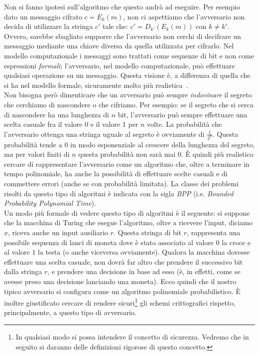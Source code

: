 \documentclass[a4paper,openright,twoside,12pt]{report}
\begin{document}
Non si fanno ipotesi sull'algoritmo che questo andr\`a ad eseguire.
Per esempio dato un messaggio cifrato $c=E_k(m)$, non ci aspettiamo che l'avversario non decida di utilizzare la stringa $c'$ tale che:  $c'=D_{k'}(E_k(m))$ con $k\neq k'$. 
Ovvero, sarebbe sbagliato supporre che l'avversario non cerchi di decifrare un messaggio mediante una chiave diversa 
da quella utilizzata per cifrarlo.
Nel modello computazionale i messaggi sono trattati come sequenze di bit e non come espressioni \emph{formali}; l'avversario, nel modello computazionale, pu\`o effettuare qualsiasi operazione su un messaggio. Questa visione \`e, a differenza di quella 
che si ha nel modello formale, sicuramente molto pi\`u realistica~\cite{DBLP:conf/crypto/2006}.\\

Non bisogna per\`o dimenticare che un avversario può sempre \emph{indovinare} il segreto che cerchiamo di nascondere o che cifriamo. 
Per esempio: se il segreto che si cerca di nascondere ha una lunghezza di $n$ bit, l'avversario pu\`o sempre effettuare una scelta casuale fra il valore 0 e il valore 1 per $n$ volte.
La probabilit\`a che l'avversario ottenga una stringa uguale al segreto \`e ovviamente di $\frac{1}{2^n}$. 
Questa probabilit\`a tende a 0 in modo esponenziale al crescere della lunghezza del segreto, ma per valori finiti di $n$ questa probabilit\`a non sar\`a mai 0.
\`E quindi pi\`u realistico cercare di rappresentare l'avversario come un algoritmo che, oltre a terminare in tempo polinomiale, ha
anche la possibilit\`a di effettuare scelte casuali e di commettere errori (anche se con probabilit\`a limitata).
La classe dei problemi risolti da questo tipo di algoritmi \`e indicata con la
sigla \emph{BPP} (i.e. \emph{Bounded Probability Polynomial Time}).\\Un modo pi\`u formale di vedere questo tipo di algoritmi \`e il seguente: si suppone che la macchina di Turing che 
esegue l'algoritmo, oltre a ricevere l'input, diciamo $x$, riceva anche un input ausiliario $r$. Questa stringa di bit $r$, rappresenta una possibile sequenza di lanci di moneta dove \`e stato associato al valore $0$ la croce e al valore $1$ la testa (o anche viceversa ovviamente).
Qualora la macchina dovesse effettuare una scelta casuale, non dovr\`a far altro che prendere il successivo bit dalla stringa $r$, e prendere una decisione in base ad esso
(\`e, in effetti, come se avesse preso una decisione lanciando una moneta). Ecco quindi che il nostro tipico avversario si configura come un algoritmo polinomiale probabilistico.
\`E inoltre giustificato cercare di rendere sicuri\footnote{In qualsiasi modo si possa intendere il concetto di sicurezza. Vedremo che in seguito si daranno delle definizioni rigorose di questo concetto.} gli schemi crittografici rispetto, principalmente, a questo tipo di avversario.
\end{document}
